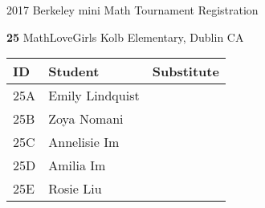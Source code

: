 \documentclass[12pt]{amsart}
\begin{document}
\newpage



\renewcommand{\TeamID}{25}
\renewcommand{\TeamName}{MathLoveGirls}
\renewcommand{\SchoolName}{Kolb Elementary, Dublin CA}
\renewcommand{\IDA}{25A}
\renewcommand{\IDB}{25B}
\renewcommand{\IDC}{25C}
\renewcommand{\IDD}{25D}
\renewcommand{\IDE}{25E}
\renewcommand{\StudentA}{Emily Lindquist}
\renewcommand{\StudentB}{Zoya Nomani}
\renewcommand{\StudentC}{Annelisie Im}
\renewcommand{\StudentD}{Amilia Im}
\renewcommand{\StudentE}{Rosie Liu}

\begin{center}
{\sc \Large 2017 Berkeley mini Math Tournament Registration}

\bigskip
\bigskip

{\bf \Large  \TeamID} \hfill {\large \TeamName} \hfill {\large \SchoolName}

\bigskip
\bigskip

\begin{tabular}{| p{} | p{} | p{} |}
\hline
\bf ID         & \bf Student             & \bf Substitute             \\ \hline
\IDA           & \StudentA               &                            \\ \hline
\IDB           & \StudentB               &                            \\ \hline
\IDC           & \StudentC               &                            \\ \hline
\IDD           & \StudentD               &                            \\ \hline
\IDE           & \StudentE               &                            \\ \hline
\end{tabular} 
\end{center}
\bigskip
\bigskip

\newpage



\renewcommand{\TeamID}{26}
\renewcommand{\TeamName}{The Unicorns}
\renewcommand{\SchoolName}{Longfellow Middle School}
\renewcommand{\IDA}{26A}
\renewcommand{\IDB}{26B}
\renewcommand{\IDC}{26C}
\renewcommand{\IDD}{26D}
\renewcommand{\IDE}{26E}
\renewcommand{\StudentA}{Lianna Leung}
\renewcommand{\StudentB}{Claudia Johnson}
\renewcommand{\StudentC}{Camila Vanderpol}
\renewcommand{\StudentD}{Mia Cordero}
\renewcommand{\StudentE}{Cynthia Estela}
\end{document}
